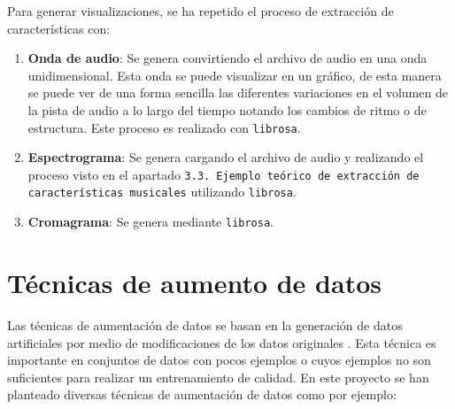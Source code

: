 Para generar visualizaciones, se ha repetido el proceso de extracción de características con:

\begin{enumerate}
\tightlist
\item \textbf{Onda de audio}: Se genera convirtiendo el archivo de audio en una onda unidimensional. Esta onda se puede visualizar en un gráfico, de esta manera se puede ver de una forma sencilla las diferentes variaciones en el volumen de la pista de audio a lo largo del tiempo notando los cambios de ritmo o de estructura. Este proceso es realizado con \texttt{librosa}.

\item \textbf{Espectrograma}: Se genera cargando el archivo de audio y realizando el proceso visto en el apartado \texttt{3.3. Ejemplo teórico de extracción de características musicales} utilizando \texttt{librosa}.

\item \textbf{Cromagrama}: Se genera mediante \texttt{librosa}.
\end{enumerate}

\newpage

\section{Técnicas de aumento de datos}

Las técnicas de aumentación de datos se basan en la generación de datos artificiales por medio de modificaciones de los datos originales \cite{PIERGALLINI_2023}. Esta técnica es importante en conjuntos de datos con pocos ejemplos o cuyos ejemplos no son suficientes para realizar un entrenamiento de calidad.
En este proyecto se han planteado diversas técnicas de aumentación de datos como por ejemplo:

